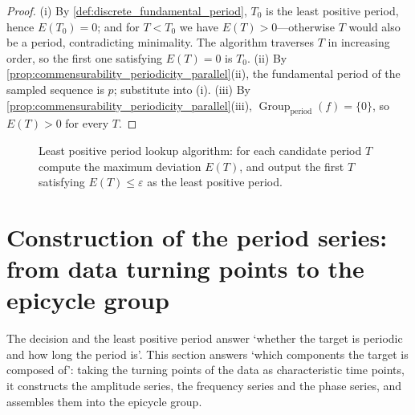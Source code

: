\begin{proof}
(i) By \cref{def:discrete_fundamental_period}, $T_0$ is the least positive period, hence $E(T_0)=0$; and for $T<T_0$ we have $E(T)>0$---otherwise $T$ would also be a period, contradicting minimality. The algorithm traverses $T$ in increasing order, so the first one satisfying $E(T)=0$ is $T_0$.
(ii) By \cref{prop:commensurability_periodicity_parallel}(ii), the fundamental period of the sampled sequence is $p$; substitute into (i).
(iii) By \cref{prop:commensurability_periodicity_parallel}(iii), $\operatorname{Group}_{\mathrm{period}}(f)=\{0\}$, so $E(T)>0$ for every $T$.
\end{proof}

\begin{figure}[htbp]
\centering
{}
\caption{Least positive period lookup algorithm: for each candidate period $T$ compute the maximum deviation $E(T)$, and output the first $T$ satisfying $E(T)\le\varepsilon$ as the least positive period.}
\label{fig:ps_minimal_period}
\end{figure}

\section{Construction of the period series: from data turning points to the epicycle group}\label{sec:ps_series_construction}

The decision and the least positive period answer `whether the target is periodic and how long the period is'. This section answers `which components the target is composed of': taking the turning points of the data as characteristic time points, it constructs the amplitude series, the frequency series and the phase series, and assembles them into the epicycle group.

